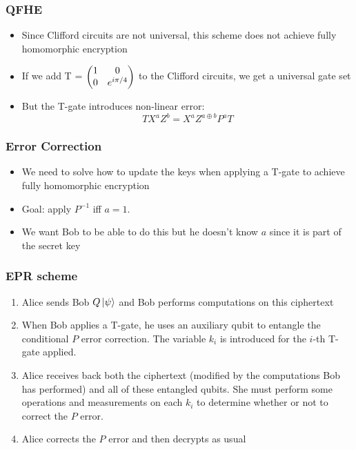 \begin{frame}
 \frametitle{QFHE}
 \begin{itemize}
   \item Since Clifford circuits are not universal, this scheme does not achieve fully homomorphic encryption
   \item If we add T = $\begin{pmatrix} 1 & 0 \\ 0 & e^{\mathnormal{i} \pi / 4}  \end{pmatrix}$ to the Clifford circuits, we get a universal gate set
   \item But the T-gate introduces non-linear error: \\ 
   \[  TX^aZ^b = X^aZ^{a \oplus b}P^aT  \]
 \end{itemize}
\end{frame}
 
\begin{frame}
 \frametitle{Error Correction}
 \begin{itemize}
    \item We need to solve how to update the keys when applying a T-gate to achieve fully homomorphic encryption
   \item Goal: apply $P^{-1}$ iff $a = 1$. 
   \item We want Bob to be able to do this but he doesn't know $a$ since it is part of the secret key
 \end{itemize}
\end{frame}
 
\begin{frame}
\frametitle{EPR scheme}
\begin{enumerate}
   \item Alice sends Bob $Q\left\vert{\psi}\right\rangle$ and Bob performs computations on this ciphertext
   \item When Bob applies a T-gate, he uses an auxiliary qubit to entangle the conditional $P$ error correction. The variable $k_i$ is introduced for the $i$-th T-gate applied. 
   \item Alice receives back both the ciphertext (modified by the computations Bob has performed) and all of these entangled qubits. She must perform some operations and measurements on each $k_i$ to determine whether or not to correct the $P$ error. 
   \item Alice corrects the $P$ error and then decrypts as usual
\end{enumerate}
\end{frame}

